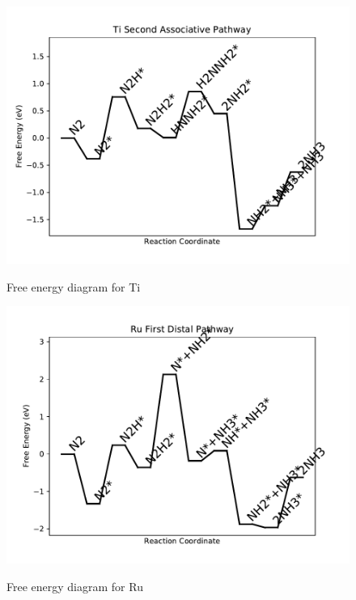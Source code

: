 \documentclass[journal=jacsat,manuscript=article]{achemso}
\begin{document}
\begin{figure}
\includegraphics[width=1\linewidth]{data/plots/Ti_associative_2.pdf}
\label{fig:Ti_associative_2}
\caption{Free energy diagram for Ti}
\end{figure}

\newpage
\begin{figure}
\includegraphics[width=1\linewidth]{data/plots/Ru_distal_1.pdf}
\label{fig:Ru_distal_1}
\caption{Free energy diagram for Ru}
\end{figure}
\end{document}
